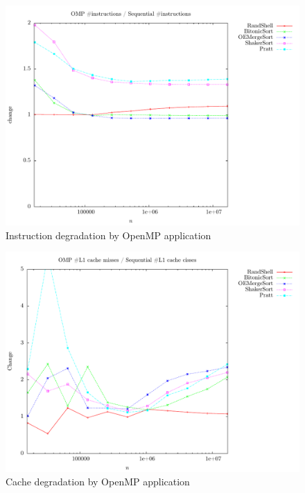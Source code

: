 \begin{figure}
\center
\includegraphics[width=\textwidth]{graphs/OMP/instrdiff.pdf}
\caption{Instruction degradation by OpenMP application}
\label{fig:OMP:instrdiff}
\end{figure}

\begin{figure}
\center
\includegraphics[width=\textwidth]{graphs/OMP/cachediff.pdf}
\caption{Cache degradation by OpenMP application}
\label{fig:OMP:cachediff}
\end{figure}

